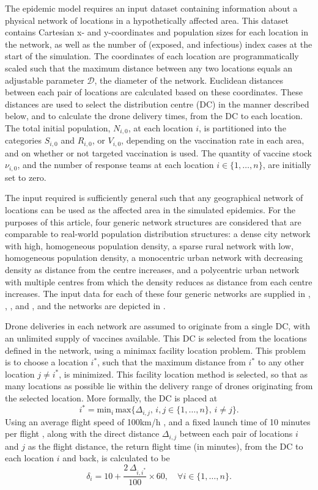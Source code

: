 \documentclass[10pt,letterpaper]{article}
\begin{document}
The epidemic model requires an input dataset containing information about a physical network of locations in a hypothetically affected area. This dataset contains Cartesian x- and y-coordinates and population sizes for each location in the network, as well as the number of (exposed, and infectious) index cases at the start of the simulation. The coordinates of each location are programmatically scaled such that the maximum distance between any two locations equals an adjustable parameter $\mathcal{D}$, the diameter of the network. Euclidean distances between each pair of locations are calculated based on these coordinates. These distances are used to select the distribution centre (DC) in the manner described below, and to calculate the drone delivery times, from the DC to each location. The total initial population, $N_{i,0}$, at each location $i$, is partitioned into the categories $S_{i,0}$ and $R_{i,0}$, or $V_{i,0}$, depending on the vaccination rate in each area, and on whether or not targeted vaccination is used. The quantity of vaccine stock $\nu_{i,0}$, and the number of response teams at each location $i \in \{1,\dots,n\}$, are initially set to zero.

The input required is sufficiently general such that any geographical network of locations can be used as the affected area in the simulated epidemics. For the purposes of this article, four generic network structures are considered that are comparable to real-world population distribution structures: a dense city network with high, homogeneous population density, a sparse rural network with low, homogeneous population density, a monocentric urban network with decreasing density as distance from the centre increases, and a polycentric urban network with multiple centres from which the density reduces as distance from each centre increases. The input data for each of these four generic networks are supplied in , , , and , and the networks are depicted in . 

Drone deliveries in each network are assumed to originate from a single DC, with an unlimited supply of vaccines available. This DC is selected from the locations defined in the network, using a minimax facility location problem. This problem is to choose a location $i^{*}$, such that the maximum distance from $i^{*}$ to any other location $j \neq i^{*}$, is minimized. This facility location method is selected, so that as many locations as possible lie within the delivery range of drones originating from the selected location. More formally, the DC is placed at $$i^{*} = \text{min}_{i} \, \text{max} \{\Delta_{i,j}, \, i, j \in \{1,\ldots,n\}, \, i \neq j\}.$$
Using an average flight speed of 100km/h \cite{zipline_impact}, and a fixed launch time of 10 minutes per flight \cite{ackerman_koziol_2019}, along with the direct distance $\Delta_{i,j}$ between each pair of locations $i$ and $j$ as the flight distance, the return flight time (in minutes), from the DC to each location $i$ and back, is calculated to be $$\delta_{i} = 10 + \frac{2 \, \Delta_{i,i^{*}}}{100} \times 60, \quad \forall{i} \in \{1, \dots, n \}.$$ 
\end{document}
